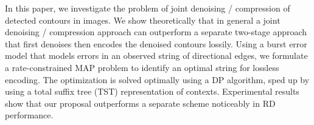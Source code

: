 In this paper, we investigate the problem of joint denoising / compression of detected contours in images. 
We show theoretically that in general a joint denoising / compression approach can outperform a separate two-stage approach that first denoises then encodes the denoised contours lossily.
Using a burst error model that models errors in an observed string of directional edges, we formulate a rate-constrained MAP problem to identify an optimal string for lossless encoding.
The optimization is solved optimally using a DP algorithm, sped up by using a total suffix tree (TST) representation of contexts.
Experimental results show that our proposal outperforms a separate scheme noticeably in RD performance.